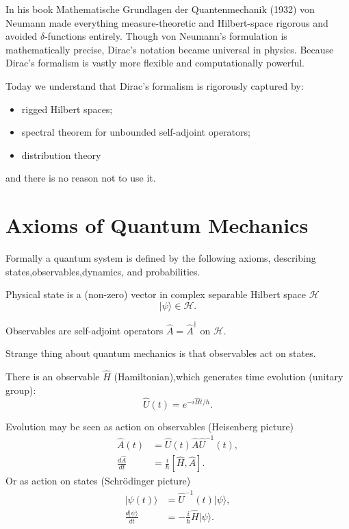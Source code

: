 In his book \cite{neumann-mfqm}  Mathematische Grundlagen der Quantenmechanik (1932)
von Neumann made everything measure-theoretic and Hilbert-space rigorous and avoided 
$ \delta $-functions entirely.
Though von Neumann’s formulation is mathematically precise,
Dirac’s notation became universal in physics.
Because Dirac’s formalism is vastly more flexible and computationally powerful.

Today we understand that Dirac’s formalism is rigorously captured by:
\begin{itemize}
   \item rigged Hilbert spaces;
\item spectral theorem for unbounded self-adjoint operators;
\item distribution theory
\end{itemize}
and there is no reason not to use it.

\section{Axioms of Quantum Mechanics}
\label{cq:aqm}

Formally a quantum system is defined by the following axioms,
describing states,observables,dynamics, and probabilities.
\begin{axiom}[States]
    \label{cq:sts}
    Physical state is a (non-zero) vector in complex separable Hilbert space $ \mathcal{H} $
\[ |\psi \rangle \in \mathcal{H} .\]
\end{axiom}

\begin{axiom}[Observables]
    \label{cq:obs}
Observables are self-adjoint operators $ \hat A= \hat A^\dagger$ on $\mathcal H$.
\end{axiom}
Strange thing about quantum mechanics is that observables act on states.
\begin{axiom}[Dynamics]
    \label{cq:dyn}
    There is an observable $ \hat H$ (Hamiltonian),which generates time evolution
    (unitary group):
    \begin{equation}
       \label {evol}
 \hat U(t) = e^{-i \hat Ht/\hbar}.
    \end{equation}
\end{axiom}

    Evolution may be seen as action on observables (Heisenberg picture)
\begin{align}
   \hat A(t)&= \hat U(t) \hat A \hat U^{-1}(t), \label {cq:heis1}\\
    \frac{d \hat A}{d t} &= \frac{i}{\hbar}[\hat H,\hat A].\label{cq:heis2}
\end{align}
    Or as action on states (Schr\"odinger picture)
\begin{align}
    |\psi(t)\rangle&= \hat U^{-1}(t) |\psi \rangle, \label{cq:schr1} \\
    \frac{d |\psi \rangle}{d t} &=-\frac{i}{\hbar} \hat H |\psi \rangle. \label{cq:schr2}
\end{align}

